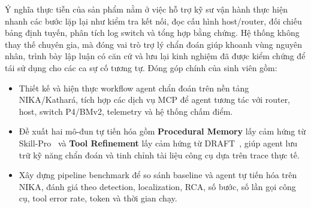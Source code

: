 Ý nghĩa thực tiễn của sản phẩm nằm ở việc hỗ trợ kỹ sư vận hành thực hiện nhanh các bước lặp lại như kiểm tra kết nối, đọc cấu hình host/router, đối chiếu bảng định tuyến, phân tích log switch và tổng hợp bằng chứng. Hệ thống không thay thế chuyên gia, mà đóng vai trò trợ lý chẩn đoán giúp khoanh vùng nguyên nhân, trình bày lập luận có căn cứ và lưu lại kinh nghiệm đã được kiểm chứng để tái sử dụng cho các ca sự cố tương tự. Đóng góp chính của sinh viên gồm:
\begin{itemize}
  \item Thiết kế và hiện thực workflow agent chẩn đoán trên nền tảng NIKA/Kathará, tích hợp các dịch vụ MCP để agent tương tác với router, host, switch P4/BMv2, telemetry và hệ thống chấm điểm.
  \item Đề xuất hai mô-đun tự tiến hóa gồm \textbf{Procedural Memory} lấy cảm hứng từ Skill-Pro~\citep{skillpro2024} và \textbf{Tool Refinement} lấy cảm hứng từ DRAFT~\citep{draft2024}, giúp agent lưu trữ kỹ năng chẩn đoán và tinh chỉnh tài liệu công cụ dựa trên trace thực tế.
  \item Xây dựng pipeline benchmark để so sánh baseline và agent tự tiến hóa trên NIKA, đánh giá theo detection, localization, RCA, số bước, số lần gọi công cụ, tool error rate, token và thời gian chạy.
\end{itemize}
